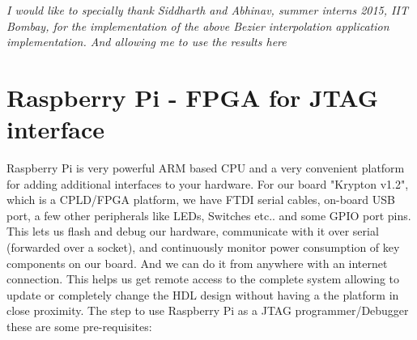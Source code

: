 \textit{I would like to specially thank Siddharth and Abhinav, summer interns 2015, IIT Bombay, for the implementation of the above Bezier interpolation application implementation. And allowing me to use the results here}

\section{Raspberry Pi - FPGA for JTAG interface}


Raspberry Pi is very powerful ARM based CPU and a very convenient platform for adding additional interfaces to your hardware. For our board "Krypton v1.2", which is a CPLD/FPGA platform, we have FTDI serial cables, on-board USB port, a few other peripherals like LEDs, Switches etc..  and some GPIO port pins. This lets us flash and debug our hardware, communicate with it over serial (forwarded over a socket), and continuously monitor power consumption of key components on our board. And we can do it from anywhere with an internet connection. This helps us get remote access to the complete system allowing to update or completely change the HDL design without having a the platform in close proximity. The step to use Raspberry Pi as a JTAG programmer/Debugger these are some pre-requisites: 

